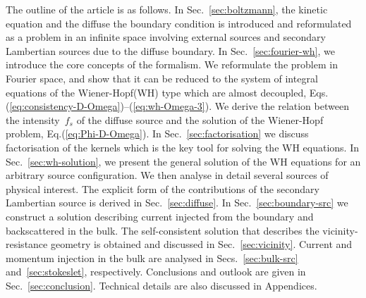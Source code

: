 \documentclass[preprint,aps,eqsecnum, prb]{revtex4-1}
\begin{document}
The outline of the article is as follows. In Sec.~\ref{sec:boltzmann},
the kinetic equation and the diffuse the boundary condition is introduced
and reformulated as a problem in an infinite space involving external
sources and secondary Lambertian sources due to the diffuse boundary.
In Sec.~\ref{sec:fourier-wh}, we introduce the core concepts of the formalism.
We reformulate the problem in Fourier space, and show that
it can be reduced to the system of integral equations of the
Wiener-Hopf(WH) type which are almost decoupled,
Eqs.(\ref{eq:consistency-D-Omega})--(\ref{eq:wh-Omega-3}).
We derive the relation between the intensity~$f_s$ of the diffuse source
and the solution of the  Wiener-Hopf problem, Eq.(\ref{eq:Phi-D-Omega}).
In Sec.~\ref{sec:factorisation} we discuss factorisation of the
kernels which is the key tool for solving the WH equations.
In Sec.~\ref{sec:wh-solution},
we present the general solution of the WH
equations for an arbitrary source configuration.
We then analyse in detail several sources of physical interest.
The explicit form of the contributions of the secondary
Lambertian source is derived in Sec.~\ref{sec:diffuse}.
In Sec.~\ref{sec:boundary-src} we construct a solution describing current
injected from the boundary and backscattered in the bulk.
The self-consistent solution that describes the vicinity-resistance geometry
is obtained and discussed in Sec.~\ref{sec:vicinity}.
Current and momentum injection in the bulk
are analysed in Secs.~\ref{sec:bulk-src} and~\ref{sec:stokeslet}, respectively.
Conclusions and outlook are given in Sec.~\ref{sec:conclusion}.
Technical details are also discussed in Appendices.
\end{document}
